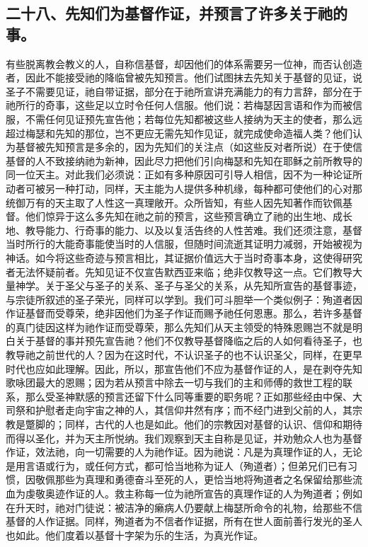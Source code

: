 
\subsection{二十八、先知们为基督作证，并预言了许多关于祂的事。}

有些脱离教会教义的人，自称信基督，却因他们的体系需要另一位神，而否认创造者，因此不能接受祂的降临曾被先知预言。他们试图抹去先知关于基督的见证，说圣子不需要见证，祂自带证据，部分在于祂所宣讲充满能力的有力言辞，部分在于祂所行的奇事，这些足以立时令任何人信服。他们说：若梅瑟因言语和作为而被信服，不需任何见证预先宣告他；若每位先知都被这些人接纳为天主的使者，那么远超过梅瑟和先知的那位，岂不更应无需先知作见证，就完成使命造福人类？他们认为基督被先知预言是多余的，因为先知们的关注点（如这些反对者所说）在于使信基督的人不致接纳祂为新神，因此尽力把他们引向梅瑟和先知在耶稣之前所教导的同一位天主。对此我们必须说：正如有多种原因可引导人相信，因不为一种论证所动者可被另一种打动，同样，天主能为人提供多种机缘，每种都可使他们的心对那统御万有的天主取了人性这一真理敞开。众所皆知，有些人因先知著作而钦佩基督。他们惊异于这么多先知在祂之前的预言，这些预言确立了祂的出生地、成长地、教导能力、行奇事的能力、以及以复活告终的人性苦难。我们还须注意，基督当时所行的大能奇事能使当时的人信服，但随时间流逝其证明力减弱，开始被视为神话。如今将这些奇迹与预言相比，其证据价值远大于当时奇事本身，这使得研究者无法怀疑前者。先知见证不仅宣告默西亚来临；绝非仅教导这一点。它们教导大量神学。关于圣父与圣子的关系、圣子与圣父的关系，从先知所宣告的基督事迹，与宗徒所叙述的圣子荣光，同样可以学到。我们可斗胆举一个类似例子：殉道者因作证基督而受尊荣，绝非因他们为圣子作证而赐予祂任何恩惠。那么，若许多基督的真门徒因这样为祂作证而受尊荣，那么先知们从天主领受的特殊恩赐岂不就是明白关于基督的事并预先宣告祂？他们不仅教导基督降临之后的人如何看待圣子，也教导祂之前世代的人？因为在这时代，不认识圣子的也不认识圣父，同样，在更早时代也应如此理解。因此，所以，那宣告他们不应为基督作证的人，是在剥夺先知歌咏团最大的恩赐；因为若从预言中除去一切与我们的主和师傅的救世工程的联系，那么受圣神默感的预言还留下什么同等重要的职务呢？正如那些经由中保、大司祭和护慰者走向宇宙之神的人，其信仰井然有序；而不经门进到父前的人，其宗教是蹩脚的；同样，古代的人也是如此。他们的宗教因对基督的认识、信仰和期待而得以圣化，并为天主所悦纳。我们观察到天主自称是见证，并劝勉众人也为基督作证，效法祂，向一切需要的人为祂作证。因为祂说：凡是为真理作证的人，无论是用言语或行为，或任何方式，都可恰当地称为证人（殉道者）；但弟兄们已有习惯，因敬佩那些为真理和勇德奋斗至死的人，更恰当地将殉道者之名保留给那些流血为虔敬奥迹作证的人。救主称每一位为祂所宣告的真理作证的人为殉道者；例如在升天时，祂对门徒说：被洁净的癞病人仍要献上梅瑟所命令的礼物，给那些不信基督的人作证据。同样，殉道者为不信者作证据，所有在世人面前善行发光的圣人也如此。他们度着以基督十字架为乐的生活，为真光作证。\par

